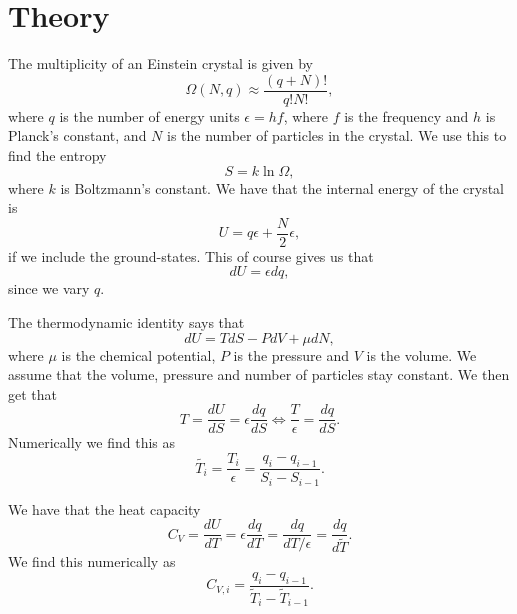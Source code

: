 \documentclass[reprint,english,notitlepage]{revtex4-1}  %
\begin{document}
\section{Theory}
The multiplicity of an Einstein crystal is given by 
\begin{equation}
 \Omega(N,q)\approx \frac{(q+N)!}{q!N!},
 \label{eq:omega}
 \end{equation}
 where $q$ is the number of energy units $\epsilon=hf$, where $f$ is the frequency and $h$ is Planck's constant, and $N$ is the number of particles in the crystal. We use this to find the entropy
  \begin{equation}
  S=k\ln\Omega,
   \label{eq:entropy}
 \end{equation}
  where $k$ is Boltzmann's constant. We have that the internal energy of the crystal is 
  \begin{equation}
  U=q\epsilon+\frac{N}{2}\epsilon,
     \label{eq:energy}
 \end{equation}
  if we include the ground-states. This of course gives us that 
  \begin{equation}
   dU=\epsilon dq,
      \label{eq:delta_energy}
 \end{equation}
  since we vary $q$. 
  
  The thermodynamic identity says that 
  \begin{equation}
  dU=TdS-PdV+\mu dN,
     \label{eq:delta_energy_2}
 \end{equation}
  where $\mu$ is the chemical potential, $P$ is the pressure and $V$ is the volume. We assume that the volume, pressure and number of particles stay constant. We then get that
  \begin{equation}
  T= \frac{dU}{dS}=\epsilon\frac{dq}{dS}\Leftrightarrow \frac{T}{\epsilon}=\frac{dq}{dS}.
     \label{eq:temperature}
 \end{equation}
  Numerically we find this as
  \begin{equation}
  \tilde{T_i} =\frac{T_i}{\epsilon}=\frac{q_i-q_{i-1}}{S_i-S_{i-1}}.
     \label{eq:temperature_numerically}
 \end{equation}

We have that the heat capacity 
\begin{equation}
C_V=\frac{dU}{dT}=\epsilon\frac{dq}{dT}=\frac{dq}{dT/\epsilon}=\frac{dq}{d\tilde{T}}.
   \label{eq:heat_capacity}
 \end{equation}
We find this numerically as 
\begin{equation}
 C_{V,i}=\frac{q_{i}-q_{i-1}}{\tilde{T}_i-\tilde{T}_{i-1}}.
    \label{eq:heat_capacity_numerically}
 \end{equation}
\end{document}
